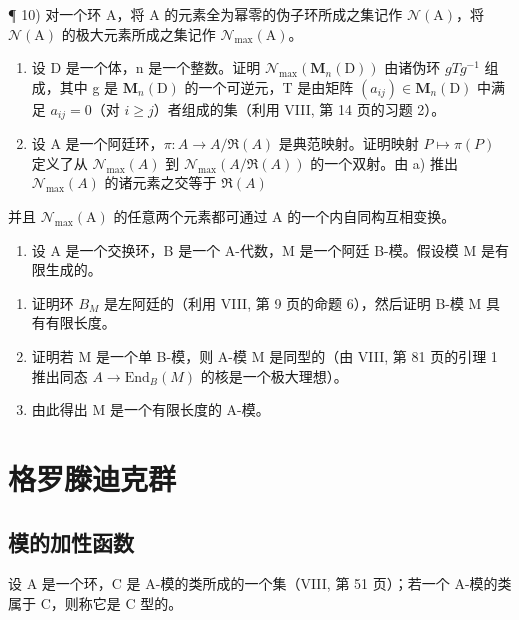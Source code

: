 ¶ 10) 对一个环 A，将 A 的元素全为幂零的伪子环所成之集记作 \(\mathcal{N}(\mathrm{A})\)，将 \(\mathcal{N}(\mathrm{A})\) 的极大元素所成之集记作 \(\mathcal{N}_{\max}(\mathrm{A})\)。

\begin{enumerate}
\def\labelenumi{\alph{enumi})}
\tightlist
\item
  设 D 是一个体，n 是一个整数。证明 \(\mathcal{N}_{\max}(\mathbf{M}_{n}(\mathrm{D}))\) 由诸伪环 \(gTg^{-1}\) 组成，其中 g 是 \(\mathbf{M}_{n}(\mathrm{D})\) 的一个可逆元，T 是由矩阵 \((a_{ij})\in\mathbf{M}_{n}(\mathrm{D})\) 中满足 \(a_{ij}=0\)（对 \(i\geqslant j\)）者组成的集（利用 VIII, 第 14 页的习题 2）。
\item
  设 A 是一个阿廷环，\(\pi:A\to A/\Re(A)\) 是典范映射。证明映射 \(P\mapsto\pi(P)\) 定义了从 \(\mathcal{N}_{\max}(A)\) 到 \(\mathcal{N}_{\max}(A/\Re(A))\) 的一个双射。由 a) 推出 \(\mathcal{N}_{\max}(A)\) 的诸元素之交等于 \(\Re(A)\)
\end{enumerate}

并且 \(\mathcal{N}_{\mathrm{max}}(\mathrm{A})\) 的任意两个元素都可通过 A 的一个内自同构互相变换。

\begin{enumerate}
\def\labelenumi{\arabic{enumi})}
\setcounter{enumi}{10}
\tightlist
\item
  设 A 是一个交换环，B 是一个 A-代数，M 是一个阿廷 B-模。假设模 M 是有限生成的。
\end{enumerate}

\begin{enumerate}
\def\labelenumi{\alph{enumi})}
\item
  证明环 \(B_{M}\) 是左阿廷的（利用 VIII, 第 9 页的命题 6），然后证明 B-模 M 具有有限长度。
\item
  证明若 M 是一个单 B-模，则 A-模 M 是同型的（由 VIII, 第 81 页的引理 1 推出同态 \(A \rightarrow \text{End}_{B}(M)\) 的核是一个极大理想）。
\item
  由此得出 M 是一个有限长度的 A-模。
\end{enumerate}

\section{格罗滕迪克群}

\subsection{模的加性函数}

设 A 是一个环，C 是 A-模的类所成的一个集（VIII, 第 51 页）；若一个 A-模的类属于 C，则称它是 C 型的。

